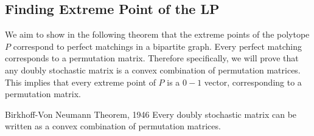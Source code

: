 \subsection{Finding Extreme Point of the LP}
We aim to show in the following theorem that the extreme points of the polytope \( P \) correspond to perfect matchings in a bipartite graph. Every perfect matching corresponds to a permutation matrix. Therefore specifically, we will prove that any doubly stochastic matrix is a convex combination of permutation matrices. This implies that every extreme point of \( P \) is a \( 0-1 \) vector, corresponding to a permutation matrix.
\begin{Theorem}{Birkhoff-Von Neumann Theorem, 1946}{}
	Every doubly stochastic matrix can be written as a convex combination of permutation matrices.
\end{Theorem}
